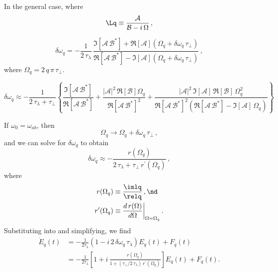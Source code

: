 In the general case, where
\begin{equation} \label{eqn:mml_1d_omega_general}
    \Lq \equiv \frac{\mathcal{A}}{\mathcal{B} - i\, \Omega}\, ,
\end{equation}

\begin{equation}
    \delta \omega_q  = -\frac{1}{2\, \tau_\lambda}\, \frac{\Im\left[\mathcal{A}\, \mathcal{B}^\ast\right] + \Re\left[\mathcal{A}\right] \left(\Omega_q + \delta \omega_q\, \tau_\perp\right)}{\Re\left[\mathcal{A}\, \mathcal{B}^\ast\right] - \Im\left[\mathcal{A}\right] \left(\Omega_q + \delta \omega_q\, \tau_\perp\right)}\, ,    
\end{equation}
where $\Omega_q = 2\, q\, \pi\, \tau_\perp$.

\begin{equation}
    \delta \omega_q \approx -\frac{1}{2\, \tau_\lambda + \tau_\perp} \left\{ \frac{\Im\left[\mathcal{A}\, \mathcal{B}^\ast\right]}{\Re\left[\mathcal{A}\, \mathcal{B}^\ast\right]} + \frac{\left|\mathcal{A}\right|^2\, \Re\left[\mathcal{B}\right] \Omega_q}{\Re\left[\mathcal{A}\, \mathcal{B}^\ast\right]^2} + \frac{\left|\mathcal{A}\right|^2\, \Im\left[\mathcal{A}\right]\, \Re\left[\mathcal{B}\right]\, \Omega_q^2}{\Re\left[\mathcal{A}\, \mathcal{B}^\ast\right]^2 \left(\Re\left[\mathcal{A}\, \mathcal{B}^\ast\right] - \Im\left[\mathcal{A}\right]\, \Omega_q\right)} \right\}
\end{equation}

If $\omega_0 = \omega_{a b}$, then
\begin{equation} \label{eqn:mml_1d_omega_q_def}
    \Omega_q \longrightarrow \Omega_q + \delta \omega_q\, \tau_\perp\, ,
\end{equation}
and we can solve for $\delta \omega_q$ to obtain
\begin{equation} \label{eqn:mml_1d_freq_pull_sol}
    \delta \omega_q \approx -\frac{r(\Omega_q)}{2\, \tau_\lambda + \tau_\perp\, r^\prime(\Omega_q)}\, ,
\end{equation}
where
\begin{subequations}
    \begin{align}
        r(\Omega_q) &\equiv \frac{\imlq}{\relq}\, , \nd \\
        r^\prime(\Omega_q) &\equiv \frac{d\, r(\Omega)}{d \Omega}\bigg|_{\Omega = \Omega_q}\, .
    \end{align}
\end{subequations}
Substituting  into  and simplifying, we find
\begin{equation} \label{eqn:mml_1d_deq_dt_fp}
    \begin{split}
        \dot{E}_q(t) &= -\frac{1}{2 \tau_\lambda} \left( 1 - i\, 2\, \delta \omega_q\, \tau_\lambda \right) E_q(t) + F_q(t) \\
        &= -\frac{1}{2 \tau_\lambda} \left[ 1 + i\, \frac{r(\Omega_q)}{1 + (\tau_\perp/2\, \tau_\lambda)\, r^\prime(\Omega_q)} \right] E_q(t) + F_q(t) .
    \end{split}
\end{equation}

